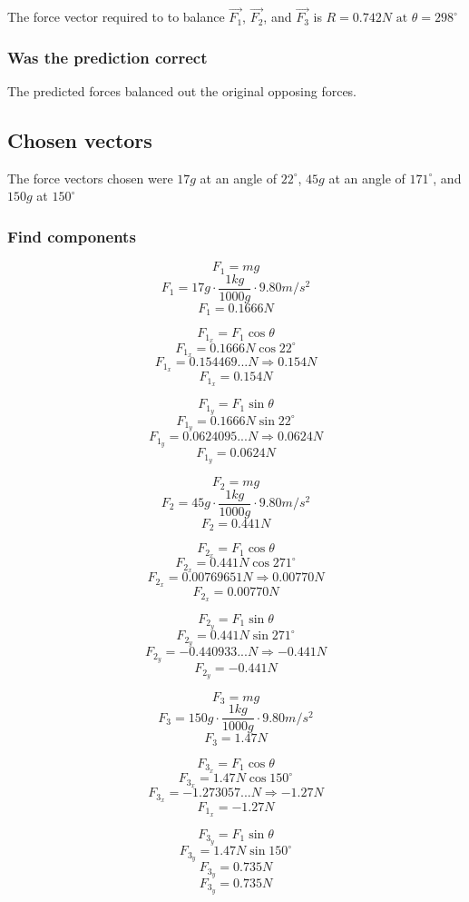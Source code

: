 \documentclass[11pt, letterpaper, includehead]{article}
\begin{document}
The force vector required to to balance $\vec{F_1}$, $\vec{F_2}$, and $\vec{F_3}$ is
$R = 0.742N \text{ at } \theta = 298^{\circ}$

\subsubsection{Was the prediction correct} %
The predicted forces balanced out the original opposing forces. 

\subsection{Chosen vectors} %
The force vectors chosen were $17g$ at an angle of $22^{\circ}$, $45g$ at an angle of $171^{\circ}$, and $150g$ at $150^{\circ}$

\subsubsection{Find components} %
\begin{multicols}{3}
  $$F_1 = mg$$
  $$F_1 = 17g \cdot \frac{1kg}{1000g} \cdot 9.80m/s^2$$
  $$F_1 = 0.1666N$$

  $$F_{1_x} = F_1\cos\theta$$
  $$F_{1_x} = 0.1666N\cos22^{\circ}$$
  $$F_{1_x} = 0.154469...N \Rightarrow 0.154N$$
  $$\boxed{F_{1_x} = 0.154N}$$

  $$F_{1_y} = F_1\sin\theta$$
  $$F_{1_y} = 0.1666N\sin22^{\circ}$$
  $$F_{1_y} = 0.0624095...N \Rightarrow 0.0624N$$
  $$\boxed{F_{1_y} = 0.0624N}$$

  \columnbreak
  $$F_2 = mg$$
  $$F_2 = 45g \cdot \frac{1kg}{1000g} \cdot 9.80m/s^2$$
  $$F_2 = 0.441N$$

  $$F_{2_x} = F_1\cos\theta$$
  $$F_{2_x} = 0.441N\cos271^{\circ}$$
  $$F_{2_x} = 0.00769651N \Rightarrow 0.00770N$$
  $$\boxed{F_{2_x} = 0.00770N}$$

  $$F_{2_y} = F_1\sin\theta$$
  $$F_{2_y} = 0.441N\sin271^{\circ}$$
  $$F_{2_y} = -0.440933...N \Rightarrow -0.441N$$
  $$\boxed{F_{2_y} = -0.441N}$$

  \columnbreak
  $$F_3 = mg$$
  $$F_3 = 150g \cdot \frac{1kg}{1000g} \cdot 9.80m/s^2$$
  $$F_3 = 1.47N$$

  $$F_{3_x} = F_1\cos\theta$$
  $$F_{3_x} = 1.47N\cos150^{\circ}$$
  $$F_{3_x} = -1.273057...N \Rightarrow -1.27N$$
  $$\boxed{F_{1_x} = -1.27N}$$

  $$F_{3_y} = F_1\sin\theta$$
  $$F_{3_y} = 1.47N\sin150^{\circ}$$
  $$F_{3_y} = 0.735N$$
  $$\boxed{F_{3_y} = 0.735N}$$
 
\end{multicols}
\end{document}
